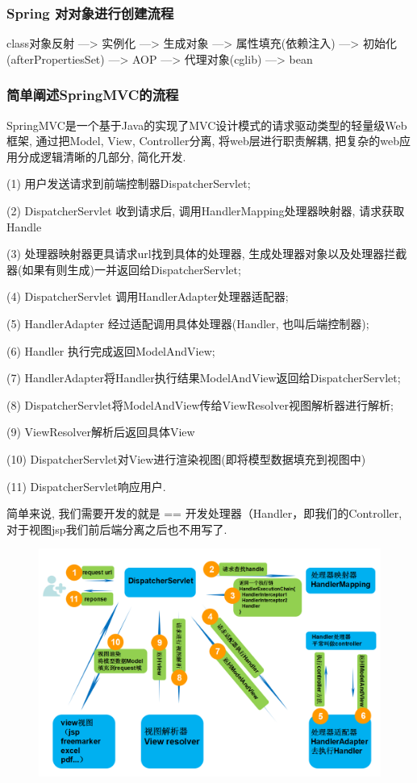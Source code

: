 \documentclass[UTF8]{ctexart}
\begin{document}
\subsubsection{Spring 对对象进行创建流程}
class对象反射 ---> 实例化 ---> 生成对象 ---> 属性填充(依赖注入)  ---> 初始化(afterPropertiesSet) ---> AOP ---> 代理对象(cglib) ---> bean
\subsubsection{简单阐述SpringMVC的流程}
	SpringMVC是一个基于Java的实现了MVC设计模式的请求驱动类型的轻量级Web框架, 通过把Model, View, Controller分离, 将web层进行职责解耦, 把复杂的web应用分成逻辑清晰的几部分, 简化开发.
\par
(1) 用户发送请求到前端控制器DispatcherServlet;
\par
(2) DispatcherServlet 收到请求后, 调用HandlerMapping处理器映射器, 请求获取Handle
\par
(3) 处理器映射器更具请求url找到具体的处理器, 生成处理器对象以及处理器拦截器(如果有则生成)一并返回给DispatcherServlet;
\par
(4) DispatcherServlet 调用HandlerAdapter处理器适配器;
\par
(5) HandlerAdapter 经过适配调用具体处理器(Handler, 也叫后端控制器);
\par
(6) Handler 执行完成返回ModelAndView;
\par
(7) HandlerAdapter将Handler执行结果ModelAndView返回给DispatcherServlet;
\par
(8) DispatcherServlet将ModelAndView传给ViewResolver视图解析器进行解析;
\par
(9) ViewResolver解析后返回具体View
\par
(10) DispatcherServlet对View进行渲染视图(即将模型数据填充到视图中)
\par
(11) DispatcherServlet响应用户.
\par
简单来说, 我们需要开发的就是 == 开发处理器（Handler，即我们的Controller, 对于视图jsp我们前后端分离之后也不用写了.
\begin{figure}
	\centering
	\includegraphics[width=0.7\linewidth]{figures/SpringModelAndView.png}
	\caption{}
	\label{fig:SpringModelAndView}
\end{figure}
\end{document}

